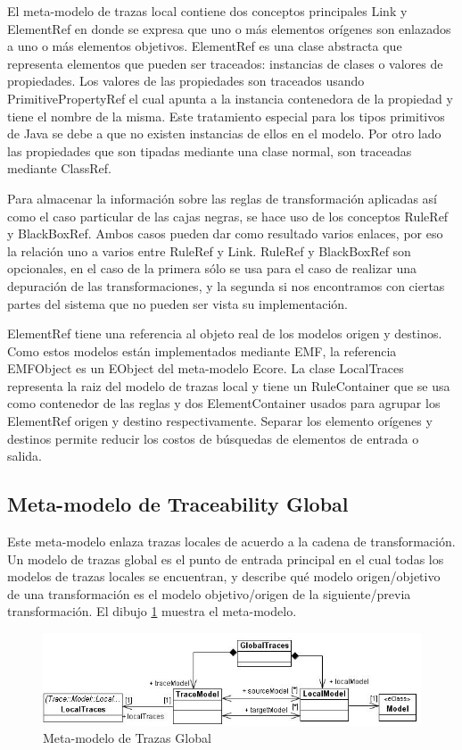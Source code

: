 \documentclass[a4paper,12pt,oneside]{book}
\begin{document}
El meta-modelo de trazas local contiene dos conceptos principales Link y ElementRef en donde se expresa que uno o más elementos orígenes son enlazados a uno o más elementos objetivos. ElementRef es una clase abstracta que representa elementos que pueden ser traceados: instancias de clases o valores de propiedades. Los valores de las propiedades son traceados usando PrimitivePropertyRef el cual apunta a la instancia contenedora de la propiedad y tiene el nombre de la misma. Este tratamiento especial para los tipos primitivos de Java se debe a que no existen instancias de ellos en el modelo. Por otro lado las propiedades que son tipadas mediante una clase normal, son traceadas mediante ClassRef.

Para almacenar la información sobre las reglas de transformación aplicadas así como el caso particular de las cajas negras, se hace uso de los conceptos RuleRef y BlackBoxRef. Ambos casos pueden dar como resultado varios enlaces, por eso la relación uno a varios entre RuleRef y Link. RuleRef y BlackBoxRef son opcionales, en el caso de la primera sólo se usa para el caso de realizar una depuración de las transformaciones, y la segunda si nos encontramos con ciertas partes del sistema que no pueden ser vista su implementación.

ElementRef tiene una referencia al objeto real de los modelos origen y destinos. Como estos modelos están implementados mediante EMF, la referencia EMFObject es un EObject del meta-modelo Ecore. La clase LocalTraces representa la raiz del modelo de trazas local y tiene un RuleContainer que se usa como contenedor de las reglas y dos ElementContainer usados para agrupar los ElementRef origen y destino respectivamente. Separar los elemento orígenes y destinos permite reducir los costos de búsquedas de elementos de entrada o salida.

\subsection{Meta-modelo de Traceability Global}

Este meta-modelo enlaza trazas locales de acuerdo a la cadena de transformación. Un modelo de trazas global es el punto de entrada principal en el cual todas los modelos de trazas locales se encuentran, y describe qué modelo origen/objetivo de una transformación es el modelo objetivo/origen de la siguiente/previa transformación. El dibujo \ref{fig:GlobalTraceMetamodel} muestra el meta-modelo.

\begin{figure}[hbtp]
\centering
\includegraphics[scale=.6]{./img/GlobalTraceMetamodel}
\caption{Meta-modelo de Trazas Global}
\label{fig:GlobalTraceMetamodel}
\end{figure}
\end{document}
